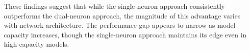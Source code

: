 These findings suggest that while the single-neuron approach consistently outperforms the dual-neuron approach, the magnitude of this advantage varies with network architecture. The performance gap appears to narrow as model capacity increases, though the single-neuron approach maintains its edge even in high-capacity models.
